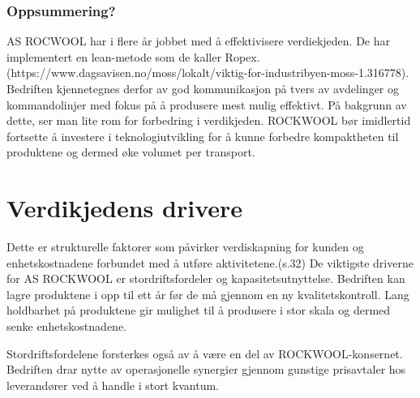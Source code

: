 \subsubsection*{Oppsummering?}
AS ROCWOOL har i flere år jobbet med å effektivisere verdiekjeden. De har implementert en lean-metode som de kaller Ropex. (https://www.dagsavisen.no/moss/lokalt/viktig-for-industribyen-moss-1.316778).
Bedriften kjennetegnes derfor av god kommunikasjon på tvers av avdelinger og kommandolinjer med fokus på å produsere mest mulig effektivt. På bakgrunn av dette, ser man lite rom for forbedring i verdikjeden. ROCKWOOL bør imidlertid fortsette å investere i teknologiutvikling for å kunne forbedre kompaktheten til produktene og dermed øke volumet per transport.

\section{Verdikjedens drivere}
Dette er strukturelle faktorer som påvirker verdiskapning for kunden og enhetskostnadene forbundet med å utføre aktivitetene.(s.32) De viktigste driverne for AS ROCKWOOL er stordriftsfordeler og kapasitetsutnyttelse. Bedriften kan lagre produktene i opp til ett år før de må gjennom en ny kvalitetskontroll. Lang holdbarhet på produktene gir mulighet til å produsere i stor skala og dermed senke enhetskostnadene.

\indent \newline
Stordriftsfordelene forsterkes også av å være en del av ROCKWOOL-konsernet. Bedriften drar nytte av operasjonelle synergier gjennom gunstige prisavtaler hos leverandører ved å handle i stort kvantum.


